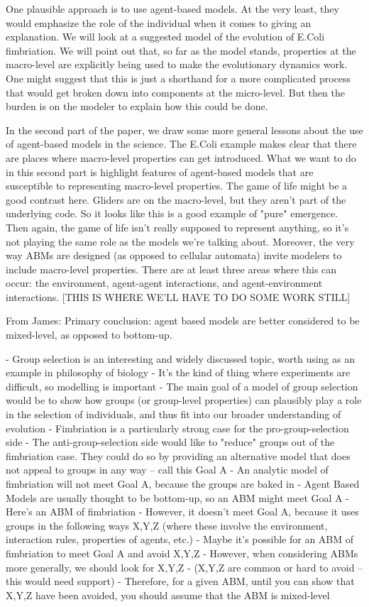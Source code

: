 \documentclass[11pt]{article}
\begin{document}
One plausible approach is to use agent-based models. At the very least, they would emphasize the role of the individual when it comes to giving an explanation. We will look at a suggested model of the evolution of E.Coli fimbriation. We will point out that, so far as the model stands, properties at the macro-level are explicitly being used to make the evolutionary dynamics work. One might suggest that this is just a shorthand for a more complicated process that would get broken down into components at the micro-level. But then the burden is on the modeler to explain how this could be done.

In the second part of the paper, we draw some more general lessons about the use of agent-based models in the science. The E.Coli example makes clear that there are places where macro-level properties can get introduced. What we want to do in this second part is highlight features of agent-based models that are susceptible to representing macro-level properties.  The game of life might be a good contrast here. Gliders are on the macro-level, but they aren't part of the underlying code. So it looks like this is a good example of "pure" emergence. Then again, the game of life isn't really supposed to represent anything, so it's not playing the same role as the models we're talking about. Moreover, the very way ABMs are designed (as opposed to cellular automata) invite modelers to include macro-level properties. There are at least three areas where this can occur: the environment, agent-agent interactions, and agent-environment interactions. [THIS IS WHERE WE'LL HAVE TO DO SOME WORK STILL]


From James:
Primary conclusion: agent based models are better considered to be mixed-level, as opposed to bottom-up.

- Group selection is an interesting and widely discussed topic, worth using as an example in philosophy of biology
- It's the kind of thing where experiments are difficult, so modelling is important
- The main goal of a model of group selection would be to show how groups (or group-level properties) can plausibly play a role in the selection of individuals, and thus fit into our broader understanding of evolution
- Fimbriation is a particularly strong case for the pro-group-selection side
- The anti-group-selection side would like to "reduce" groups out of the fimbriation case. They could do so by providing an alternative model that does not appeal to groups in any way -- call this Goal A
- An analytic model of fimbriation will not meet Goal A, because the groups are baked in
- Agent Based Models are usually thought to be bottom-up, so an ABM might meet Goal A
- Here's an ABM of fimbriation
- However, it doesn't meet Goal A, because it uses groups in the following ways X,Y,Z (where these involve the environment, interaction rules, properties of agents, etc.)
- Maybe it's possible for an ABM of fimbriation to meet Goal A and avoid X,Y,Z
- However, when considering ABMs more generally, we should look for X,Y,Z
- (X,Y,Z are common or hard to avoid -- this would need support)
- Therefore, for a given ABM, until you can show that X,Y,Z have been avoided, you should assume that the ABM is mixed-level
\end{document}

